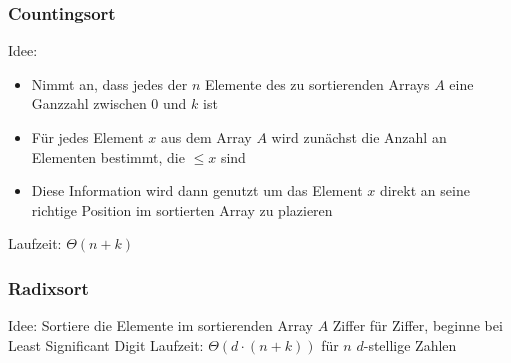 	\subsubsection{Countingsort}
	Idee: 
	\begin{itemize}
	  \item Nimmt an, dass jedes der $n$ Elemente des zu sortierenden Arrays $A$ eine Ganzzahl zwischen $0$ und $k$ ist
	  \item Für jedes Element $x$ aus dem Array $A$ wird zunächst die Anzahl an Elementen bestimmt, die $\leq x$ sind
	  \item Diese Information wird dann genutzt um das Element $x$ direkt an seine richtige Position im sortierten Array zu plazieren
	\end{itemize}
	Laufzeit: $\Theta(n+k)$
	\subsubsection{Radixsort}
	Idee: Sortiere die Elemente im sortierenden Array $A$ Ziffer für Ziffer, beginne bei Least Significant Digit \newline \newline
	Laufzeit: $\Theta(d\cdot(n+k))$ für $n$ $d$-stellige Zahlen
